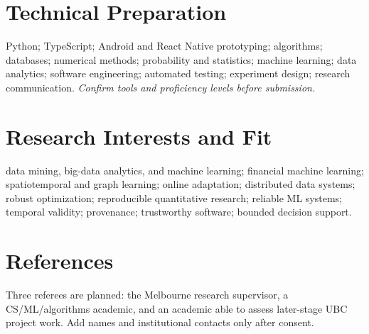 \documentclass[11pt]{article}
\begin{document}
\section*{Technical Preparation}
Python; TypeScript; Android and React Native prototyping; algorithms; databases; numerical methods; probability and statistics; machine learning; data analytics; software engineering; automated testing; experiment design; research communication. \textit{Confirm tools and proficiency levels before submission.}

\section*{Research Interests and Fit}
data mining, big-data analytics, and machine learning; financial machine learning; spatiotemporal and graph learning; online adaptation; distributed data systems; robust optimization; reproducible quantitative research; reliable ML systems; temporal validity; provenance; trustworthy software; bounded decision support.

\section*{References}
Three referees are planned: the Melbourne research supervisor, a CS/ML/algorithms academic, and an academic able to assess later-stage UBC project work. Add names and institutional contacts only after consent.
\end{document}
